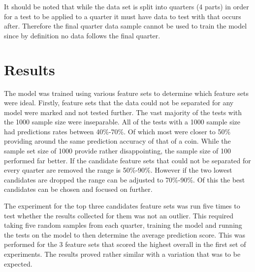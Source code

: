 
It should be noted that while the data set is split into quarters (4 parts) in order for a test to be applied to a quarter it must have data to test with that occurs after. Therefore the final quarter data sample cannot be used to train the model since by definition no data follows the final quarter.

\section{Results}

The model was trained using various feature sets to determine which feature sets were ideal. Firstly, feature sets that the data could not be separated for any model were marked and not tested further. The vast majority of the tests with the 1000 sample size were inseparable.
All of the tests with a 1000 sample size had predictions rates between 40\%-70\%. Of which most were closer to 50\% providing around the same prediction accuracy of that of a coin.
While the sample set size of 1000 provide rather disappointing, the sample size of 100 performed far better. If the candidate feature sets that could not be separated for every quarter are removed the range is 50\%-90\%. However if the two lowest candidates are dropped the range can be adjusted to 70\%-90\%. Of this the best candidates can be chosen and focused on further.

The experiment for the top three candidates feature sets was run five times to test whether the results collected for them was not an outlier. This required taking five random samples from each quarter, training the model and running the tests on the model to then determine the average prediction score. This was performed for the 3 feature sets that scored the highest overall in the first set of experiments. The results proved rather similar with a variation that was to be expected.


